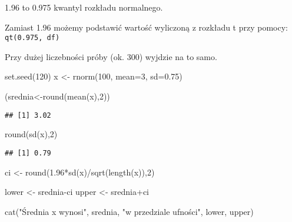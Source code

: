 \documentclass[
]{book}
\newenvironment{Shaded}{\begin{snugshade}}{\end{snugshade}}
\newcommand{\AttributeTok}[1]{\textcolor[rgb]{0.77,0.63,0.00}{#1}}
\newcommand{\DecValTok}[1]{\textcolor[rgb]{0.00,0.00,0.81}{#1}}
\newcommand{\FloatTok}[1]{\textcolor[rgb]{0.00,0.00,0.81}{#1}}
\newcommand{\FunctionTok}[1]{\textcolor[rgb]{0.00,0.00,0.00}{#1}}
\newcommand{\NormalTok}[1]{#1}
\newcommand{\OtherTok}[1]{\textcolor[rgb]{0.56,0.35,0.01}{#1}}
\newcommand{\SpecialCharTok}[1]{\textcolor[rgb]{0.00,0.00,0.00}{#1}}
\newcommand{\StringTok}[1]{\textcolor[rgb]{0.31,0.60,0.02}{#1}}
\begin{document}
1.96 to 0.975 kwantyl rozkładu normalnego.

Zamiast 1.96 możemy podstawić wartość wyliczoną z rozkładu t przy pomocy: \texttt{qt(0.975,\ df)}

Przy dużej liczebności próby (ok. 300) wyjdzie na to samo.

\begin{Shaded}
\begin{Highlighting}[]
\FunctionTok{set.seed}\NormalTok{(}\DecValTok{120}\NormalTok{)}
\NormalTok{x }\OtherTok{\textless{}{-}} \FunctionTok{rnorm}\NormalTok{(}\DecValTok{100}\NormalTok{, }\AttributeTok{mean=}\DecValTok{3}\NormalTok{, }\AttributeTok{sd=}\FloatTok{0.75}\NormalTok{)}

\NormalTok{(srednia}\OtherTok{\textless{}{-}}\FunctionTok{round}\NormalTok{(}\FunctionTok{mean}\NormalTok{(x),}\DecValTok{2}\NormalTok{))}
\end{Highlighting}
\end{Shaded}

\begin{verbatim}
## [1] 3.02
\end{verbatim}

\begin{Shaded}
\begin{Highlighting}[]
\FunctionTok{round}\NormalTok{(}\FunctionTok{sd}\NormalTok{(x),}\DecValTok{2}\NormalTok{)}
\end{Highlighting}
\end{Shaded}

\begin{verbatim}
## [1] 0.79
\end{verbatim}

\begin{Shaded}
\begin{Highlighting}[]
\NormalTok{ci }\OtherTok{\textless{}{-}} \FunctionTok{round}\NormalTok{(}\FloatTok{1.96}\SpecialCharTok{*}\FunctionTok{sd}\NormalTok{(x)}\SpecialCharTok{/}\FunctionTok{sqrt}\NormalTok{(}\FunctionTok{length}\NormalTok{(x)),}\DecValTok{2}\NormalTok{)}

\NormalTok{lower }\OtherTok{\textless{}{-}}\NormalTok{ srednia}\SpecialCharTok{{-}}\NormalTok{ci}
\NormalTok{upper }\OtherTok{\textless{}{-}}\NormalTok{ srednia}\SpecialCharTok{+}\NormalTok{ci}

\FunctionTok{cat}\NormalTok{(}\StringTok{"Średnia x wynosi"}\NormalTok{, srednia, }\StringTok{"w przedziale ufności"}\NormalTok{, lower, upper)}
\end{Highlighting}
\end{Shaded}
\end{document}
